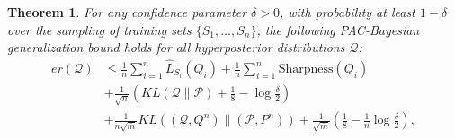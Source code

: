 \documentclass[letterpaper]{article} %
\newtheorem{theorem}{Theorem}
\begin{document}
\begin{theorem} 
For any confidence parameter \( \delta > 0 \), with probability at least \( 1 - \delta \) over the sampling of training sets \( \{ S_1, \dots, S_n \} \), the following PAC-Bayesian generalization bound holds for all hyperposterior distributions \( \mathcal{Q} \): 
\[ \begin{aligned} er(\mathcal{Q}) &\leq \frac{1}{n} \sum_{i=1}^n \hat{L}_{S_i}(Q_i) + \frac{1}{n} \sum_{i=1}^n \text{Sharpness}(Q_i) \\ &+ \frac{1}{\sqrt{n}} \left( KL(\mathcal{Q} \| \mathcal{P}) + \frac{1}{8} - \log \frac{\delta}{2} \right) \\ &+ \frac{1}{n\sqrt{\bar{m}}} KL\left( (\mathcal{Q}, Q^n) \| (\mathcal{P}, P^n) \right) + \frac{1}{\sqrt{\bar{m}}} \left( \frac{1}{8} - \frac{1}{n} \log \frac{\delta}{2} \right), \end{aligned} \] 
\end{theorem}
\end{document}
